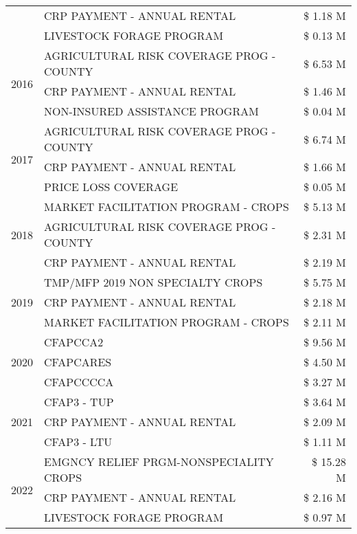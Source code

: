 \begin{tabular}{llr}
 & CRP PAYMENT - ANNUAL RENTAL & \$ 1.18 M \\
 & LIVESTOCK FORAGE PROGRAM & \$ 0.13 M \\
\cline{1-3}
\multirow[t]{3}{*}{2016} & AGRICULTURAL RISK COVERAGE PROG - COUNTY & \$ 6.53 M \\
 & CRP PAYMENT - ANNUAL RENTAL & \$ 1.46 M \\
 & NON-INSURED ASSISTANCE PROGRAM & \$ 0.04 M \\
\cline{1-3}
\multirow[t]{3}{*}{2017} & AGRICULTURAL RISK COVERAGE PROG - COUNTY & \$ 6.74 M \\
 & CRP PAYMENT - ANNUAL RENTAL & \$ 1.66 M \\
 & PRICE LOSS COVERAGE & \$ 0.05 M \\
\cline{1-3}
\multirow[t]{3}{*}{2018} & MARKET FACILITATION PROGRAM - CROPS & \$ 5.13 M \\
 & AGRICULTURAL RISK COVERAGE PROG - COUNTY & \$ 2.31 M \\
 & CRP PAYMENT - ANNUAL RENTAL & \$ 2.19 M \\
\cline{1-3}
\multirow[t]{3}{*}{2019} & TMP/MFP 2019 NON SPECIALTY CROPS & \$ 5.75 M \\
 & CRP PAYMENT - ANNUAL RENTAL & \$ 2.18 M \\
 & MARKET FACILITATION PROGRAM - CROPS & \$ 2.11 M \\
\cline{1-3}
\multirow[t]{3}{*}{2020} & CFAPCCA2 & \$ 9.56 M \\
 & CFAPCARES & \$ 4.50 M \\
 & CFAPCCCCA & \$ 3.27 M \\
\cline{1-3}
\multirow[t]{3}{*}{2021} & CFAP3 - TUP & \$ 3.64 M \\
 & CRP PAYMENT - ANNUAL RENTAL & \$ 2.09 M \\
 & CFAP3 - LTU & \$ 1.11 M \\
\cline{1-3}
\multirow[t]{3}{*}{2022} & EMGNCY RELIEF PRGM-NONSPECIALITY CROPS & \$ 15.28 M \\
 & CRP PAYMENT - ANNUAL RENTAL & \$ 2.16 M \\
 & LIVESTOCK FORAGE PROGRAM & \$ 0.97 M \\
\cline{1-3}
\bottomrule
\end{tabular}
